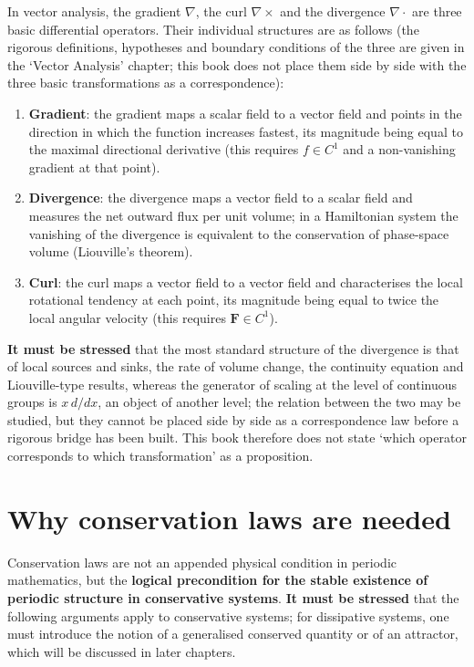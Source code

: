 In vector analysis, the gradient $\nabla$, the curl $\nabla\times$ and the divergence $\nabla\cdot$ are three basic differential operators. Their individual structures are as follows (the rigorous definitions, hypotheses and boundary conditions of the three are given in the `Vector Analysis' chapter; this book does not place them side by side with the three basic transformations as a correspondence):

\begin{enumerate}[leftmargin=4em, label={(\arabic*)}]
    \item \textbf{Gradient}: the gradient maps a scalar field to a vector field and points in the direction in which the function increases fastest, its magnitude being equal to the maximal directional derivative (this requires $f \in C^1$ and a non-vanishing gradient at that point).
    \item \textbf{Divergence}: the divergence maps a vector field to a scalar field and measures the net outward flux per unit volume; in a Hamiltonian system the vanishing of the divergence is equivalent to the conservation of phase-space volume (Liouville's theorem).
    \item \textbf{Curl}: the curl maps a vector field to a vector field and characterises the local rotational tendency at each point, its magnitude being equal to twice the local angular velocity (this requires $\mathbf{F} \in C^1$).
\end{enumerate}

\textbf{It must be stressed} that the most standard structure of the divergence is that of local sources and sinks, the rate of volume change, the continuity equation and Liouville-type results, whereas the generator of scaling at the level of continuous groups is $x\,d/dx$, an object of another level; the relation between the two may be studied, but they cannot be placed side by side as a correspondence law before a rigorous bridge has been built. This book therefore does not state `which operator corresponds to which transformation' as a proposition.

\section*{Why conservation laws are needed}

Conservation laws are not an appended physical condition in periodic mathematics, but the \textbf{logical precondition for the stable existence of periodic structure in conservative systems}. \textbf{It must be stressed} that the following arguments apply to conservative systems; for dissipative systems, one must introduce the notion of a generalised conserved quantity or of an attractor, which will be discussed in later chapters.

